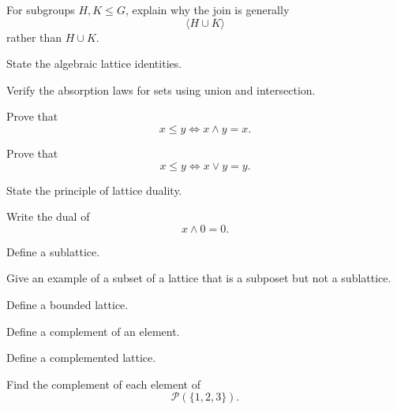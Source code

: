 \begin{exercise}[2]
For subgroups \(H,K\leq G\), explain why the join is generally
\[ \langle H\cup K\rangle \]
rather than \(H\cup K\).
\end{exercise}

\begin{exercise}[1]
State the algebraic lattice identities.
\end{exercise}

\begin{exercise}[2]
Verify the absorption laws for sets using union and intersection.
\end{exercise}

\begin{exercise}[2]
Prove that
\[ x\leq y\iff x\wedge y=x. \]
\end{exercise}

\begin{exercise}[2]
Prove that
\[ x\leq y\iff x\vee y=y. \]
\end{exercise}

\begin{exercise}[1]
State the principle of lattice duality.
\end{exercise}

\begin{exercise}[2]
Write the dual of
\[ x\wedge0=0. \]
\end{exercise}

\begin{exercise}[1]
Define a sublattice.
\end{exercise}

\begin{exercise}[2]
Give an example of a subset of a lattice that is a subposet but not a
sublattice.
\end{exercise}

\begin{exercise}[1]
Define a bounded lattice.
\end{exercise}

\begin{exercise}[1]
Define a complement of an element.
\end{exercise}

\begin{exercise}[1]
Define a complemented lattice.
\end{exercise}

\begin{exercise}[2]
Find the complement of each element of
\[ \mathcal P(\{1,2,3\}). \]
\end{exercise}

